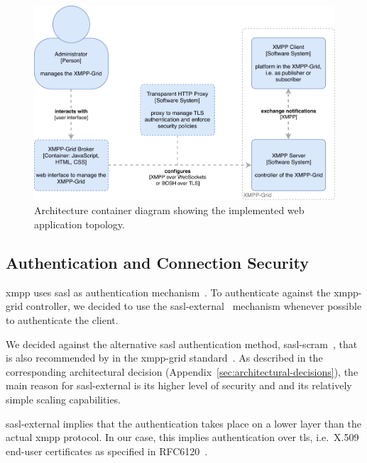 \begin{figure}[H]
    \centering
    \includegraphics[width=\linewidth]{resources/architecture_container_webapplication_with_http_proxy}
    \caption[Architecture container diagram: Web application with transparent proxy]{Architecture container diagram showing the implemented web application topology.}
    \label{fig:architecturecontainerweb-http-proxy}
\end{figure}
  

\subsection{Authentication and Connection Security}\label{sec:authentication-and-connection-security}

\gls{xmpp} uses \gls{sasl} as authentication mechanism~\cite{rfc6120}.
To authenticate against the \gls{xmpp-grid} \gls{controller}, we decided to use the \gls{sasl-external}~\cite{rfc4422} mechanism whenever possible to authenticate the client.

We decided against the alternative \gls{sasl} authentication method, \gls{sasl-scram}~\cite{rfc7677}, that is also recommended by in the \gls{xmpp-grid} standard~\cite{ietf-mile-xmpp-grid-05}.
As described in the corresponding architectural decision (Appendix~\ref{sec:architectural-decisions}), the main reason for \gls{sasl-external} is its higher level of security and and its relatively simple scaling capabilities.

\gls{sasl-external} implies that the authentication takes place on a lower layer than the actual \gls{xmpp} protocol. In our case, this implies authentication over \gls{tls}, i.e.~X.509 end-user certificates as specified in RFC6120~\cite{rfc6120}.

